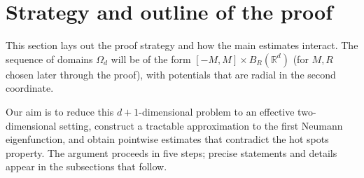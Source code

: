 \section{Strategy and outline of the proof}

This section lays out the proof strategy and how the main estimates interact. The sequence of domains $\Omega_d$ will be of the form $[-M,M]\times B_R(\mathbb R^d)$ (for $M,R$ chosen later through the proof), with potentials that are radial in the second coordinate.

Our aim is to reduce this $d+1$-dimensional problem to an effective two-dimensional setting, construct a tractable approximation to the first Neumann eigenfunction, and obtain pointwise estimates that contradict the hot spots property. The argument proceeds in five steps; precise statements and details appear in the subsections that follow.

